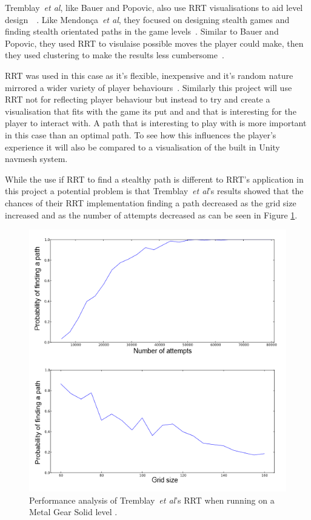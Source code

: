 \documentclass[journal]{IEEEtran}
\begin{document}
Tremblay~\textit{et al}, like Bauer and Popovic, also use RRT visualisations to aid level design~\cite{Tremblay2013}~\cite{bauer2012}. Like Mendonça~\textit{et al}, they focused on designing stealth games and finding stealth orientated paths in the game levels~\cite{Mendonça2015}. Similar to Bauer and Popovic, they used RRT to visulaise possible moves the player could make, then they used clustering to make the results less cumbersome~\cite{Tremblay2013}. 

RRT was used in this case as it's flexible, inexpensive and it's random nature mirrored a wider variety of player behaviours~\cite{Tremblay2013}. Similarly this project will use RRT not for reflecting player behaviour but instead to try and create a visualisation that fits with the game its put and and that is interesting for the player to interact with. A path that is interesting to play with is more important in this case than an optimal path. To see how this influences the player's experience it will also be compared to a visualisation of the built in Unity navmesh system. 


While the use if RRT to find a stealthy path is different to RRT's application in this project a potential problem is that Tremblay~\textit{et al}'s results showed that the chances of their RRT implementation finding a path decreased as the grid size increased and as the number of attempts decreased as can be seen in Figure \ref{TremblayRRT}. 

\begin{figure}[h]
	\includegraphics[width=1.0\linewidth]{Tremblay2013.png}
	\caption{ Performance analysis of Tremblay~\textit{et al}'s RRT when running on a Metal Gear Solid level \cite{Tremblay2013}.}
	\label{TremblayRRT}
\end{figure} 
\end{document}
